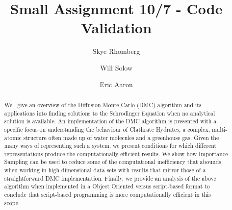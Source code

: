 \documentclass[journal=jacsat,manuscript=article]{achemso}
\author{Skye Rhomberg}
\author{Will Solow}
\author{Eric Aaron}
\affiliation[Colby College]
{Department of Computer Science, Colby College, Waterville, ME}
\title[An \textsf{achemso} demo]
  {Small Assignment 10/7 - Code Validation}
\begin{document}
%
%
%
%
%

\begin{abstract}
We~\cite{Anderson1975} give an overview of the Diffusion Monte Carlo (DMC) algorithm and its applications into finding solutions to the Schrodinger Equation when no analytical solution is available. An implementation of the DMC algorithm is presented with a specific focus on understanding the behaviour of Clathrate Hydrates, a complex, multi-atomic structure often made up of water molecules and a greenhouse gas. Given the many ways of representing such a system, we present conditions for which different representations produce the computationally efficient results. We show how Importance Sampling can be used to reduce some of the computational inefficiency that abounds when working in high dimensional data sets with results that mirror those of a straightforward DMC implementation. Finally, we provide an analysis of the above algorithm when implemented in a Object Oriented versus script-based format to conclude that script-based programming is more computationally efficient in this scope.
\end{abstract}
\end{document}
